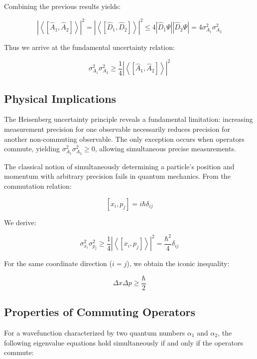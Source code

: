 \documentclass[italian]{HKNdocument}
\begin{document}
Combining the previous results yields:

\begin{equation}
\left|\left\langle\left[\hat{A}_{1}, \hat{A}_{2}\right]\right\rangle\right|^{2}=\left|\left\langle\left[\hat{D}_{1}, \hat{D}_{2}\right]\right\rangle\right|^{2} \leq 4\left|\hat{D}_{1} \Psi\right|\left|\hat{D}_{2} \Psi\right|=4 \sigma_{A_{1}}^{2} \sigma_{A_{2}}^{2}
\end{equation}

Thus we arrive at the fundamental uncertainty relation:

\begin{equation}
\sigma_{A_{1}}^{2} \sigma_{A_{2}}^{2} \geq \frac{1}{4}\left|\left\langle\left[\hat{A}_{1}, \hat{A}_{2}\right]\right\rangle\right|^{2}
\end{equation}

\subsection{Physical Implications}
The Heisenberg uncertainty principle reveals a fundamental limitation: increasing measurement precision for one observable necessarily reduces precision for another non-commuting observable. The only exception occurs when operators commute, yielding $\sigma_{A_{1}}^{2} \sigma_{A_{2}}^{2} \geq 0$, allowing simultaneous precise measurements.

The classical notion of simultaneously determining a particle's position and momentum with arbitrary precision fails in quantum mechanics. From the commutation relation:

\begin{equation}
\left[x_{i}, p_{j}\right]=i \hbar \delta_{i j}
\end{equation}

We derive:

\begin{equation}
\sigma_{x_{i}}^{2} \sigma_{p_{j}}^{2} \geq \frac{1}{4}\left|\left\langle\left[x_{i}, p_{j}\right]\right\rangle\right|^{2}=\frac{\hbar^{2}}{4} \delta_{i j}
\end{equation}

For the same coordinate direction ($i=j$), we obtain the iconic inequality:

\begin{equation}
\Delta x \Delta p \geq \frac{\hbar}{2}
\end{equation}

\subsection{Properties of Commuting Operators}
For a wavefunction characterized by two quantum numbers $\alpha_1$ and $\alpha_2$, the following eigenvalue equations hold simultaneously if and only if the operators commute:
\end{document}
